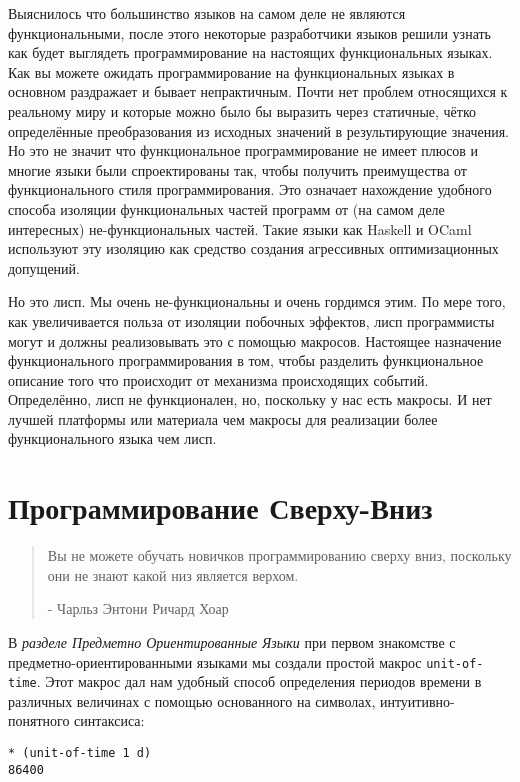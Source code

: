 Выяснилось что большинство языков на самом деле не являются функциональными, после этого некоторые разработчики языков решили узнать как будет выглядеть программирование на настоящих функциональных языках. Как вы можете ожидать программирование на функциональных языках в основном раздражает и бывает непрактичным. Почти нет проблем относящихся к реальному миру и которые можно было бы выразить через статичные, чётко определённые преобразования из исходных значений в результирующие значения. Но это не значит что функциональное программирование не имеет плюсов и многие языки были спроектированы так, чтобы получить преимущества от функционального стиля программирования. Это означает нахождение удобного способа изоляции функциональных частей программ от (на самом деле интересных) не-функциональных частей. Такие языки как Haskell и OCaml используют эту изоляцию как средство создания агрессивных оптимизационных допущений. 

Но это лисп. Мы очень не-функциональны и очень гордимся этим. По мере того, как увеличивается польза от изоляции побочных эффектов, лисп программисты могут и должны реализовывать это с помощью макросов. Настоящее назначение функционального программирования в том, чтобы разделить функциональное описание того что происходит от механизма происходящих событий. Определённо, лисп не функционален, но, поскольку у нас есть макросы. И нет лучшей платформы или материала чем макросы для реализации более функционального языка чем лисп.

\section{Программирование Сверху-Вниз}\label{section_top-down_programming}

\begin{quote}
Вы не можете обучать новичков программированию сверху вниз, поскольку они не знают какой низ является верхом.

- Чарльз Энтони Ричард Хоар
\end{quote}

В \emph{разделе Предметно Ориентированные Языки} при первом знакомстве с предметно-ориентированными языками мы создали простой макрос \verb"unit-of-time". Этот макрос дал нам удобный способ определения периодов времени в различных величинах с помощью основанного на символах, интуитивно-понятного синтаксиса:

\begin{verbatim}
* (unit-of-time 1 d)
86400
\end{verbatim}

